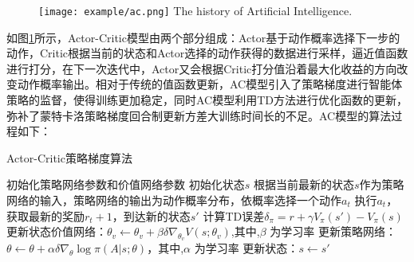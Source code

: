 \begin{figure}[htpb]
	\centering
	\texttt{[image: example/ac.png]}
	{The history of Artificial Intelligence.}
	\label{fig:ac}
\end{figure}
如图\ref{fig:ac}所示，Actor-Critic模型由两个部分组成：Actor基于动作概率选择下一步的动作，Critic根据当前的状态和Actor选择的动作获得的数据进行采样，逼近值函数进行打分，在下一次迭代中，Actor又会根据Critic打分值沿着最大化收益的方向改变动作概率输出。相对于传统的值函数更新，AC模型引入了策略梯度进行智能体策略的监督，使得训练更加稳定，同时AC模型利用TD方法进行优化函数的更新，弥补了蒙特卡洛策略梯度回合制更新方差大训练时间长的不足。AC模型的算法过程如下：

\begin{algorithm}
	\caption{Actor-Critic策略梯度算法}
	\label{algo:DQN}
	\begin{algorithmic}[1] %
		\State 初始化策略网络参数和价值网络参数
		\State 初始化状态$ {s}$
		\State 根据当前最新的状态$ {s}$作为策略网络的输入，策略网络的输出为动作概率分布，依概率选择一个动作$ a_t $
		\State 执行$a_t $，获取最新的奖励$ r_t+1 $，到达新的状态$ {s'}$
		\State 计算TD误差${\delta _\pi } = r + \gamma {V_\pi }(s') - {V_\pi }(s)$
		\State 更新状态价值网络：${\theta _v} \leftarrow {\theta _v} + \beta \delta {\nabla _{{\theta _v}}}V(s;{\theta _v})$,其中,$\beta$ 为学习率
		\State 更新策略网络：$\theta  \leftarrow \theta  + \alpha \delta {\nabla _\theta }\log \pi (A|s;\theta )$，其中,$\alpha$ 为学习率
		\State 更新状态：$ s \leftarrow s'$
		\EndFor
		\EndFor
	\end{algorithmic}
\end{algorithm}

